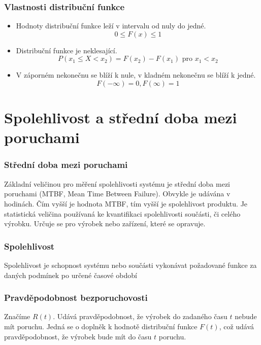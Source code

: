 \documentclass[FM,RP]{tulthesis}
\begin{document}
        \subsubsection*{Vlastnosti distribuční funkce}
            \begin{itemize} 
                \item
                Hodnoty distribuční funkce leží v intervalu od nuly do jedné.
                $$ 0 \leq F(x) \leq 1 $$
                \item
                Distribuční funkce je neklesající.
                $$  P(x_{1} \leq X < x_{2}) = F(x_{2}) - F(x_{1}) \mbox{ pro }x_{1} < x_{2} $$
                \item
                V záporném nekonečnu se blíží k nule, v kladném nekonečnu se blíží k jedné.
                $$ F(- ∞) = 0, F(∞) = 1 $$ 
            \end{itemize}

    \section*{Spolehlivost a střední doba mezi poruchami}
        \subsubsection*{Střední doba mezi poruchami}
            Základní veličinou pro měření spolehlivosti systému je střední doba mezi poruchami (MTBF, Mean Time
            Between Failure). Obvykle je udávána v hodinách. Čím vyšší je hodnota MTBF, tím vyšší je spolehlivost
            produktu.\cite{3}
            Je statistická veličina používaná ke kvantifikaci spolehlivosti součásti, či celého výrobku.
            Určuje se pro výrobek nebo zařízení, které se opravuje. \cite{3}
        \subsubsection*{Spolehlivost}
            Spolehlivost je schopnost systému nebo součásti vykonávat požadované funkce za daných
            podmínek po určené časové období \cite{1} 


        \subsubsection*{Pravděpodobnost bezporuchovosti}
            Značíme $ R(t) $. Udává pravděpodobnost, že výrobek do zadaného času $ t $ nebude mít poruchu. Jedná se o doplněk k hodnotě distribuční funkce $ F(t) $,
            což udává pravděpodobnost, že výrobek bude mít do času $ t $ poruchu.\cite{5}
\end{document}
